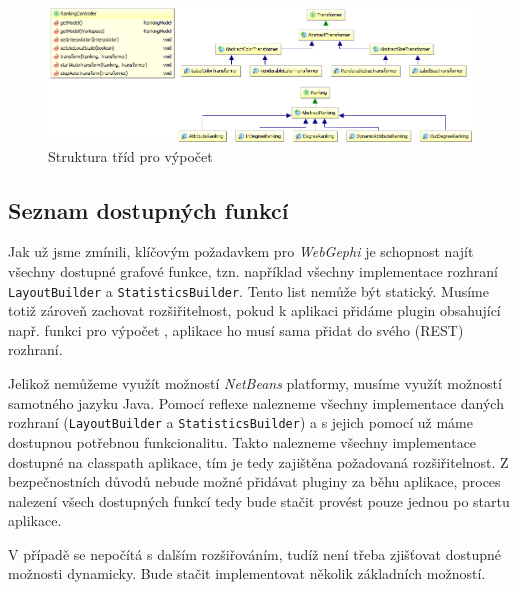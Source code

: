 \documentclass[thesis=M,czech]{FITthesis}[2014/05/6]
\begin{document}
\begin{figure}\centering
 	\includegraphics[width=1\textwidth]{images/class-diagram/ranking}
 	\caption[Struktura tříd pro výpočet ]{Struktura tříd pro výpočet }\label{fig:uml-ranking}
\end{figure}



\subsection{Seznam dostupných funkcí}
Jak už jsme zmínili, klíčovým požadavkem pro \textit{WebGephi} je schopnost najít všechny dostupné grafové funkce, tzn. například všechny implementace
rozhraní \texttt{Layout\-Builder} a \texttt{Statistics\-Builder}. Tento list nemůže být statický. Musíme totiž zároveň zachovat rozšiřitelnost, 
pokud k aplikaci přidáme plugin obsahující např. funkci pro výpočet , aplikace ho musí sama přidat do svého (REST) rozhraní.

Jelikož nemůžeme využít možností \textit{NetBeans} platformy, musíme využít možností samotného jazyku Java. Pomocí reflexe nalezneme všechny
implementace daných rozhraní (\texttt{LayoutBuilder} a \texttt{StatisticsBuilder}) a s jejich pomocí už máme dostupnou potřebnou funkcionalitu.
Takto nalezneme všechny implementace dostupné na classpath aplikace, tím je tedy zajištěna požadovaná rozšiřitelnost. Z bezpečnostních důvodů
nebude možné přidávat pluginy za běhu aplikace, proces nalezení všech dostupných funkcí tedy bude stačit provést pouze jednou po startu aplikace.

V případě  se nepočítá s dalším rozšiřováním, tudíž není třeba zjišťovat dostupné možnosti dynamicky. Bude stačit implementovat několik základních možností.
 
\end{document}
